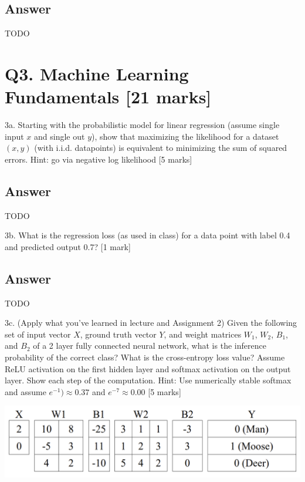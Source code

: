 \documentclass[
	12pt, %
]{fphw}
\begin{document}
\subsection*{Answer}
TODO
\section*{Q3. Machine Learning Fundamentals [21 marks]}

\begin{problem}
3a. Starting with the probabilistic model for linear regression (assume single input $x$ and
single out $y$), show that maximizing the likelihood for a dataset $(x,y)$ (with i.i.d.
datapoints) is equivalent to minimizing the sum of squared errors. Hint: go via negative
log likelihood [5 marks]
\end{problem}
\subsection*{Answer}
TODO
\begin{problem}
3b. What is the regression loss (as used in class) for a data point with label 0.4 and
predicted output 0.7? [1 mark]
\end{problem}
\subsection*{Answer}
TODO
\begin{problem}
3c. (Apply what you’ve learned in lecture and Assignment 2) Given the following set of
input vector $X$, ground truth vector $Y$, and weight matrices $W_1$, $W_2$, $B_1$, and $B_2$ of a 2
layer fully connected neural network, what is the inference probability of the correct
class? What is the cross-entropy loss value? Assume ReLU activation on the first hidden
layer and softmax activation on the output layer. Show each step of the computation.
Hint: Use numerically stable softmax and assume $e^{-1}) \approx 0.37$ and $e^{-7}\approx 0.00$ [5
		marks]
\begin{center}
	\includegraphics[width=0.75\columnwidth, page=1]{3c.png} %
\end{center}
\end{problem}
\end{document}
